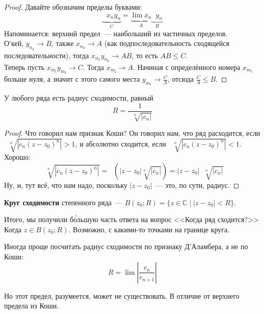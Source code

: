 \documentclass{article}
\DeclareMathOperator*{\limsup}{\overline{\lim}}
\begin{document}
    \begin{proof}
        Давайте обозначим пределы буквами:
        $$
        \underbrace{\limsup x_ny_n}_C=\underbrace{\lim x_n}_A\underbrace{\limsup y_n}_B
        $$
        Напоминается: верхний предел~--- наибольший из частичных пределов.\\
        О'кей, $y_{n_k}\to B$, также $x_{n_k}\to A$ (как подпоследовательность сходящейся последовательности), тогда $x_{n_k}y_{n_k}\to AB$, то есть $AB\leqslant C$.\\
        Теперь пусть $x_{m_l}y_{m_l}\to C$. Тогда $x_{m_l}\to A$. Начиная с определённого номера $x_{m_l}$ больше нуля, а значит с этого самого места $y_{m_l}\to \frac CA$, отсюда $\frac CA\leqslant B$.
    \end{proof}
    \begin{theorem}
        \label{Формула Коши-Адамара}
        У любого ряда есть радиус сходимости, равный
        $$
        R=\frac1{\limsup\sqrt[n]{|c_n|}}
        $$
    \end{theorem}
    \begin{proof}
        Что говорил нам признак Коши? Он говорил нам, что ряд расходится, если $\limsup\sqrt[n]{|c_n(z-z_0)^n|}>1$, и абсолютно сходится, если $\limsup\sqrt[n]{|c_n(z-z_0)^n|}<1$. Хорошо:
        $$
        \limsup\sqrt[n]{|c_n(z-z_0)^n|}=\limsup(|z-z_0|\sqrt[n]{|c_n|})=|z-z_0|\limsup\sqrt[n]{|c_n|}
        $$
        Ну, и, тут всё, что нам надо, поскольку $|z-z_0|$~--- это, по сути, радиус.
    \end{proof}
    \begin{definition}
        \textbf{Круг сходимости} степенного ряда~--- $B(z_0;R)=\{z\in\mathbb C\mid|z-z_0|<R\}$.
    \end{definition}
    \begin{remark}
        Итого, мы получили б\'{о}льшую часть ответа на вопрос <<Когда ряд сходится?>> Когда $z\in B(z_0;R)$. Возможно, с какими-то точками на границе круга.
    \end{remark}
    \begin{claim}
        \label{Радиус сходимости по Д'Аламберу}
        Иногда проще посчитать радиус сходимости по признаку Д'Аламбера, а не по Коши:
        $$
        R=\lim\left|\frac{c_n}{c_{n+1}}\right|
        $$
    \end{claim}
    \begin{remark}
        Но этот предел, разумеется, может не существовать. В отличие от верхнего предела из Коши.
    \end{remark}
\end{document}
